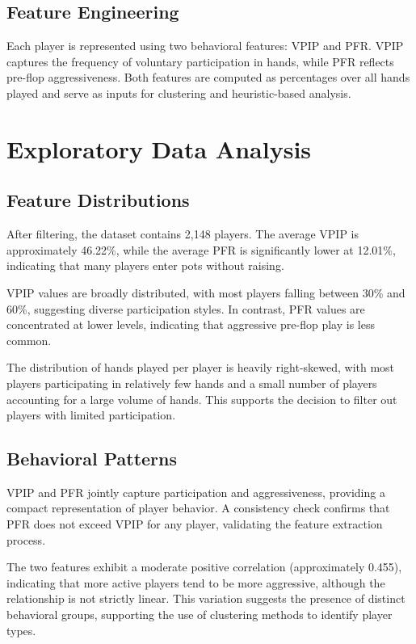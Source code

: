 \documentclass[11pt]{extarticle}
\begin{document}
\subsection{Feature Engineering}
Each player is represented using two behavioral features: VPIP and PFR. VPIP captures the frequency of voluntary participation in hands, while PFR reflects pre-flop aggressiveness. Both features are computed as percentages over all hands played and serve as inputs for clustering and heuristic-based analysis.

\section{Exploratory Data Analysis}
\subsection{Feature Distributions}
After filtering, the dataset contains 2,148 players. The average VPIP is approximately 46.22\%, while the average PFR is significantly lower at 12.01\%, indicating that many players enter pots without raising.

VPIP values are broadly distributed, with most players falling between 30\% and 60\%, suggesting diverse participation styles. In contrast, PFR values are concentrated at lower levels, indicating that aggressive pre-flop play is less common.

The distribution of hands played per player is heavily right-skewed, with most players participating in relatively few hands and a small number of players accounting for a large volume of hands. This supports the decision to filter out players with limited participation.

\subsection{Behavioral Patterns}
VPIP and PFR jointly capture participation and aggressiveness, providing a compact representation of player behavior. A consistency check confirms that PFR does not exceed VPIP for any player, validating the feature extraction process.

The two features exhibit a moderate positive correlation (approximately 0.455), indicating that more active players tend to be more aggressive, although the relationship is not strictly linear. This variation suggests the presence of distinct behavioral groups, supporting the use of clustering methods to identify player types.
\end{document}
